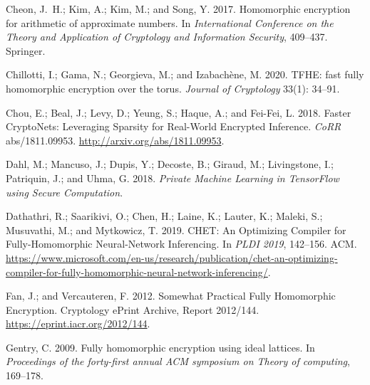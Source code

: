 \documentclass[letterpaper]{article} %
\begin{document}
\begin{thebibliography}{25}
Cheon, J.~H.; Kim, A.; Kim, M.; and Song, Y. 2017.
\newblock Homomorphic encryption for arithmetic of approximate numbers.
\newblock In \emph{International Conference on the Theory and Application of
  Cryptology and Information Security}, 409--437. Springer.

Chillotti, I.; Gama, N.; Georgieva, M.; and Izabach{\`e}ne, M. 2020.
\newblock TFHE: fast fully homomorphic encryption over the torus.
\newblock \emph{Journal of Cryptology} 33(1): 34--91.

Chou, E.; Beal, J.; Levy, D.; Yeung, S.; Haque, A.; and Fei{-}Fei, L. 2018.
\newblock Faster CryptoNets: Leveraging Sparsity for Real-World Encrypted
  Inference.
\newblock \emph{CoRR} abs/1811.09953.
\newblock \urlprefix\url{http://arxiv.org/abs/1811.09953}.

Dahl, M.; Mancuso, J.; Dupis, Y.; Decoste, B.; Giraud, M.; Livingstone, I.;
  Patriquin, J.; and Uhma, G. 2018.
\newblock \emph{Private Machine Learning in TensorFlow using Secure
  Computation}.

Dathathri, R.; Saarikivi, O.; Chen, H.; Laine, K.; Lauter, K.; Maleki, S.;
  Musuvathi, M.; and Mytkowicz, T. 2019.
\newblock CHET: An Optimizing Compiler for Fully-Homomorphic Neural-Network
  Inferencing.
\newblock In \emph{PLDI 2019}, 142--156. ACM.
\newblock
  \urlprefix\url{https://www.microsoft.com/en-us/research/publication/chet-an-optimizing-compiler-for-fully-homomorphic-neural-network-inferencing/}.

Fan, J.; and Vercauteren, F. 2012.
\newblock Somewhat Practical Fully Homomorphic Encryption.
\newblock Cryptology ePrint Archive, Report 2012/144.
\newblock \url{https://eprint.iacr.org/2012/144}.

Gentry, C. 2009.
\newblock Fully homomorphic encryption using ideal lattices.
\newblock In \emph{Proceedings of the forty-first annual ACM symposium on
  Theory of computing}, 169--178.


\end{thebibliography}
\end{document}
